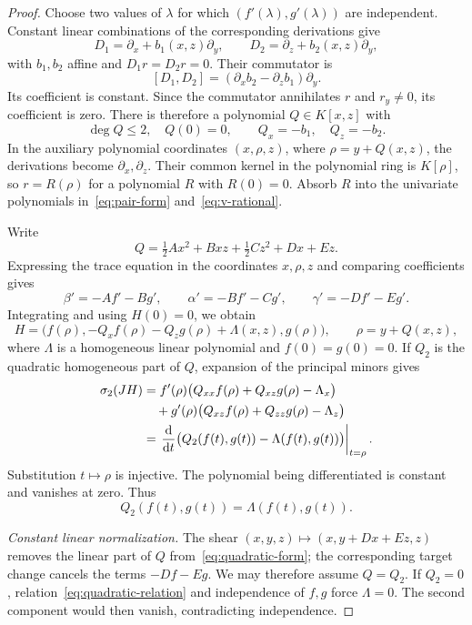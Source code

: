 \begin{proof}
Choose two values of $\lambda$ for which $(f'(\lambda),g'(\lambda))$ are independent. Constant linear combinations of the corresponding derivations give
\[
 D_1=\partial_x+b_1(x,z)\partial_y,\qquad
 D_2=\partial_z+b_2(x,z)\partial_y,
\]
with $b_1,b_2$ affine and $D_1r=D_2r=0$. Their commutator is
\[
 [D_1,D_2]=(\partial_xb_2-\partial_zb_1)\partial_y.
\]
Its coefficient is constant. Since the commutator annihilates $r$ and $r_y\neq0$, its coefficient is zero. There is therefore a polynomial $Q\in K[x,z]$ with
\[
 \deg Q\leq2,\quad Q(0)=0,\qquad Q_x=-b_1,\quad Q_z=-b_2.
\]
In the auxiliary polynomial coordinates $(x,\rho,z)$, where $\rho=y+Q(x,z)$, the derivations become $\partial_x,\partial_z$. Their common kernel in the polynomial ring is $K[\rho]$, so $r=R(\rho)$ for a polynomial $R$ with $R(0)=0$. Absorb $R$ into the univariate polynomials in~\eqref{eq:pair-form} and~\eqref{eq:v-rational}.

Write
\[
 Q=\tfrac12Ax^2+Bxz+\tfrac12Cz^2+Dx+Ez.
\]
Expressing the trace equation in the coordinates $x,\rho,z$ and comparing coefficients gives
\[
 \beta'=-Af'-Bg',\qquad \alpha'=-Bf'-Cg',\qquad \gamma'=-Df'-Eg'.
\]
Integrating and using $H(0)=0$, we obtain
\begin{equation}\label{eq:quadratic-form}
 H=\bigl(f(\rho),-Q_xf(\rho)-Q_zg(\rho)+\Lambda(x,z),g(\rho)\bigr),
 \qquad \rho=y+Q(x,z),
\end{equation}
where $\Lambda$ is a homogeneous linear polynomial and $f(0)=g(0)=0$. If $Q_2$ is the quadratic homogeneous part of $Q$, expansion of the principal minors gives
\begin{align}\label{eq:quadratic-relation-derivative}
 \sigma_2(JH)
 &=f'(\rho)\bigl(Q_{xx}f(\rho)+Q_{xz}g(\rho)-\Lambda_x\bigr)\notag\\
 &\quad+g'(\rho)\bigl(Q_{xz}f(\rho)+Q_{zz}g(\rho)-\Lambda_z\bigr)\\
 &=\left.\frac{\mathrm d}{\mathrm d t}
 \bigl(Q_2(f(t),g(t))-\Lambda(f(t),g(t))\bigr)\right|_{t=\rho}.\notag
\end{align}
Substitution $t\mapsto \rho$ is injective. The polynomial being differentiated is constant and vanishes at zero. Thus
\begin{equation}\label{eq:quadratic-relation}
 Q_2(f(t),g(t))=\Lambda(f(t),g(t)).
\end{equation}

\smallskip\noindent\emph{Constant linear normalization.}
The shear $(x,y,z)\mapsto(x,y+Dx+Ez,z)$ removes the linear part of $Q$ from~\eqref{eq:quadratic-form}; the corresponding target change cancels the terms $-Df-Eg$. We may therefore assume $Q=Q_2$. If $Q_2=0$, relation~\eqref{eq:quadratic-relation} and independence of $f,g$ force $\Lambda=0$. The second component would then vanish, contradicting independence.


\end{proof}
